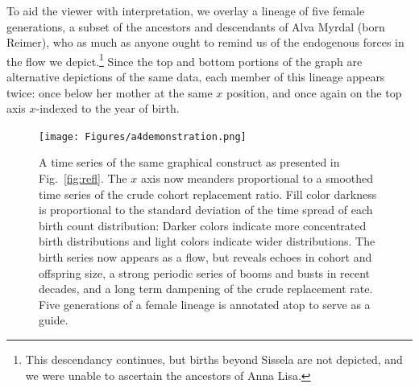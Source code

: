 \documentclass{article}
\begin{document}
To aid the viewer with interpretation, we overlay a lineage of five female generations, a subset of the ancestors and descendants of Alva Myrdal (born Reimer), who as much as anyone ought to remind us of the endogenous forces in the flow we depict.\footnote{This descendancy continues, but births beyond Sissela are not depicted, and we were unable to ascertain the ancestors of Anna Lisa.} Since the top and bottom portions of the graph are alternative depictions of the same data, each member of this lineage appears twice: once below her mother at the same $x$ position, and once again on the top axis $x$-indexed to the year of birth. 

\begin{figure}
\texttt{[image: Figures/a4demonstration.png]}
%
\caption{A time series of the same graphical construct as presented in Fig.~\ref{fig:refl}. The $x$ axis now meanders proportional to a smoothed time series of the crude cohort replacement ratio. Fill color darkness is proportional to the standard deviation of the time spread of each birth count distribution: Darker colors indicate more concentrated birth distributions and light colors indicate wider distributions. The birth series now appears as a flow, but reveals echoes in cohort and offspring size, a strong periodic series of booms and busts in recent decades, and a long term dampening of the crude replacement rate. Five generations of a female lineage is annotated atop to serve as a guide.}
\label{fig:foldout}
\end{figure}

\end{document}
